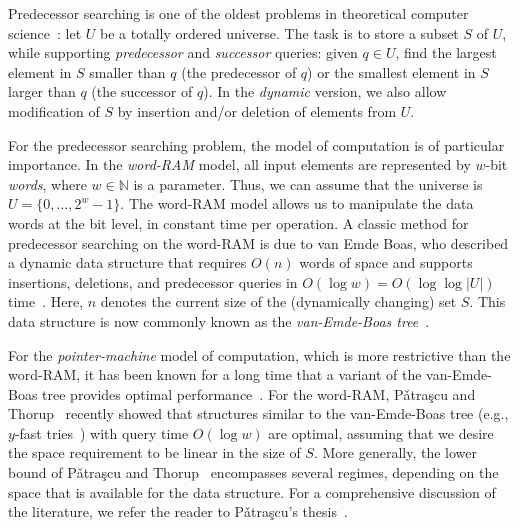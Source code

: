 \documentclass[a4paper,11pt]{article}
\newcommand{\N}{\mathbb{N}}
\newcommand{\?}{\mskip1.5mu}
\newcommand{\Patrascu}{P\v{a}tra\c{s}cu\xspace}
\newcommand{\aremark}[3]{\textcolor{blue}{\textsc{#1 #2:}}
  \textcolor{red}{\textsf{#3}}}
\newcommand{\wolfgang}[2][says]{\aremark{Wolfgang}{#1}{#2}}
\begin{document}
Predecessor searching is one of the oldest problems 
in theoretical computer science~\cite{CormenLeRiSt09,Knuth98}: 
let $U$ be a totally ordered universe. The task is 
to store a subset $S$ of $U$, while supporting 
\emph{predecessor} and \emph{successor} queries: 
given $q \in U$, find the largest element in $S$ 
smaller than $q$ (the predecessor of $q$) or the 
smallest element in $S$ larger than $q$ (the 
successor of $q$). In the \emph{dynamic} version, 
we also allow modification of $S$ by insertion 
and/or deletion of elements from $U$.

For the predecessor searching problem, the model 
of computation is of particular importance. In 
the \emph{word-RAM} model, all input elements 
are represented by $w$-bit \emph{words}, where 
$w \in \N$ is a parameter. Thus, we can assume 
that the universe is $U = \{0, \dots, 2^{w}-1\}$. 
The word-RAM model allows us to 
manipulate the data words at the bit level, 
in constant time per operation. A classic 
method for predecessor searching on the 
word-RAM is due to van Emde Boas, who described 
a dynamic data structure that requires $O(n)$ words
of space and supports insertions, deletions, and 
predecessor queries in 
$O(\log w) = O(\log\log |U|)$ 
time~\cite{vEmdeBoas77,vEmdeBoasKaZi76,CormenLeRiSt09}.
Here, $n$ denotes the current size of the
(dynamically changing) set $S$. This data 
structure is now commonly known as the 
\emph{van-Emde-Boas tree}~\cite{CormenLeRiSt09}.

For the \emph{pointer-machine} model of computation, 
which is more restrictive than the word-RAM, it has 
been known for a long time that a variant of the 
van-Emde-Boas tree provides optimal 
performance~\cite{MehlhornNaAl88,Mulzer09}.
For the word-RAM, \Patrascu and Thorup~\cite{PatrascuTh06,PatrascuTh07} 
recently showed that structures similar to the 
van-Emde-Boas tree (e.g., $y$-fast tries~\cite{Willard83}) 
with query time $O(\log w)$ are optimal, assuming that 
we desire the space requirement to be linear in the 
size of $S$. More generally, the lower bound of 
\Patrascu and Thorup~\cite{PatrascuTh06,PatrascuTh07} 
encompasses several regimes, depending on the 
space that is available for the data structure.
For a comprehensive discussion of the literature, we refer
the reader to \Patrascu's thesis~\cite{Patrascu08}.
\end{document}
